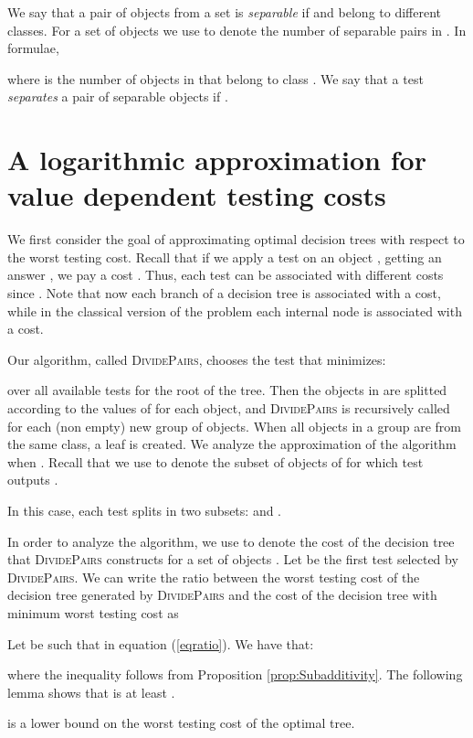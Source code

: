 \documentclass{llncs}
\begin{document}
We say that a pair of objects   from a set  
is {\em separable} if  and  belong to different classes.
For a set of objects  we use 
 to denote the number of separable pairs in
. In formulae,

where  is the number of objects in  that belong to class .
We say that a test  {\em separates} a pair of separable objects 
if .


\section{A logarithmic approximation for value dependent testing costs}\label{sec:binary}

We first consider the goal of approximating optimal decision trees with respect to the 
worst testing cost. Recall that if we apply a test  
on an object , getting an answer , we pay a cost . Thus, each test can be associated with 
 different costs since . Note that now each 
branch of a decision tree is associated with a cost, while in the classical version of the problem each internal node is associated 
with a cost.


Our algorithm, called \textsc{DividePairs}, chooses the test  that minimizes:


over all available tests for the root of the tree. Then the objects in  are splitted according to the values of  for each object, 
and \textsc{DividePairs} is recursively called for each (non empty) new group of objects. When all objects in a group are from the same class, a leaf is created. We analyze the approximation of the algorithm when  . 
Recall that we use  to denote  
 the subset of objects of  for which test  outputs
.

In this case, each test  splits  in two subsets:  and .


In order to analyze the algorithm, 
we use  to denote the cost of the decision tree that \textsc{DividePairs} constructs
for a set of objects .
Let  be the first test selected by \textsc{DividePairs}.
  We can write
 the ratio between the worst testing cost of the decision tree generated by
 \textsc{DividePairs} and the cost of the decision tree with minimum worst testing cost as



Let  be such that  in equation 
(\ref{eqratio}). We have that:


where the inequality follows from Proposition \ref{prop:Subadditivity}. The 
following lemma shows  that  is at least .

\begin{lemma}
 is a lower bound on the worst testing cost of the optimal tree.
\end{lemma}
\end{document}
